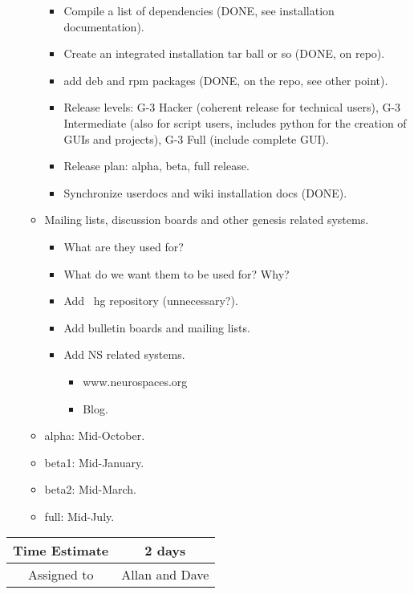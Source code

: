 \documentclass[12pt]{article}
\begin{document}
\begin{itemize}
\begin{itemize}
\begin{itemize}
    \item Compile a list of dependencies (DONE, see installation documentation).
    \item Create an integrated installation tar ball or so (DONE, on repo).
    \item add deb and rpm packages (DONE, on the repo, see other point).
    \item Release levels: G-3 Hacker (coherent release for technical
      users), G-3 Intermediate (also for script users, includes python
      for the creation of GUIs and projects), G-3 Full (include
      complete GUI).
    \item Release plan: alpha, beta, full release.
    \item Synchronize userdocs and wiki installation docs (DONE).
    \end{itemize}
  \item Mailing lists, discussion boards and other genesis related systems.
    \begin{itemize}
    \item What are they used for?
    \item What do we want them to be used for? Why?
    \item Add {\ hg} repository (unnecessary?).
    \item Add bulletin boards and mailing lists.
    \item Add NS related systems.
      \begin{itemize}
      \item www.neurospaces.org
      \item Blog.
      \end{itemize}
    \end{itemize}
  \item alpha: Mid-October.
  \item beta1: Mid-January.
  \item beta2: Mid-March.
  \item full: Mid-July.
  \end{itemize}
\end{itemize}

\begin{center}
  \vspace{5mm}
  \centering
  \begin{tabular}{|c|c|}
    \hline
    Time Estimate
    & 2 days \\
    \hline
    Assigned to
    & Allan and Dave \\
    \hline
  \end{tabular}
\end{center}
\end{document}
